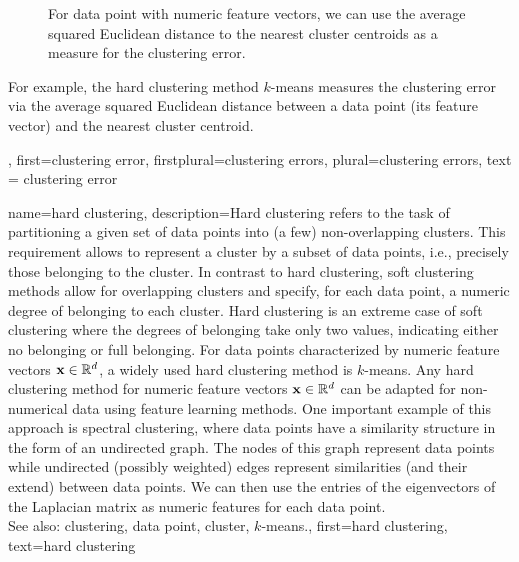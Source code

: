 {{{\begin{figure}
\caption{For data point with numeric feature vectors, we can use the 
average squared Euclidean distance to the nearest cluster centroids as a measure for the clustering error.}
\end{figure}
	For example, the hard clustering 
	method $k$-means measures the clustering error via the average squared 
	Euclidean distance between a data point (its feature vector) and the nearest cluster centroid. 
	}, 
	first={clustering error}, 
	firstplural={clustering errors}, 
	plural={clustering errors}, 
	text = {clustering error}
}



{name={hard clustering}, 
	description={Hard clustering 
		refers to the task of partitioning a given set of data points 
		into (a few) non-overlapping clusters. This requirement 
		allows to represent a cluster by a subset of data points, 
		i.e., precisely those belonging to the cluster. In contrast to 
		hard clustering, soft clustering methods allow for overlapping 
		clusters and specify, for each data point, a numeric degree of belonging 
		to each cluster. Hard clustering is an extreme case of soft clustering 
		where the degrees of belonging take only two values, indicating either no belonging or 
		full belonging. 
		For data points characterized by numeric feature vectors ${\bf x} \in \mathbb{R}^{d}$, 
		a widely used hard clustering method is $k$-means. Any 
		hard clustering method for numeric feature vectors ${\bf x} \in \mathbb{R}^{d}$ can 
		be adapted for non-numerical data using feature learning methods. 
		One important example of this approach is spectral clustering, where 
		data points have a similarity structure in the form of an undirected 
		graph. The nodes of this graph represent data points 
		while undirected (possibly weighted) edges represent similarities (and their 
		extend) between data points. We can then use the entries of the 
		eigenvectors of the Laplacian matrix as numeric features for 
		each data point. 
		\\
		See also: clustering, data point, cluster, $k$-means.},
	first={hard clustering},
	text={hard clustering} 
}
	
}
